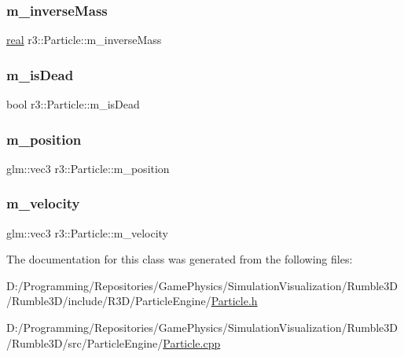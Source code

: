 \subsubsection{\texorpdfstring{m\+\_\+inverse\+Mass}{m\_inverseMass}}
{\footnotesize\ttfamily \mbox{\hyperlink{namespacer3_ab2016b3e3f743fb735afce242f0dc1eb}{real}} r3\+::\+Particle\+::m\+\_\+inverse\+Mass\hspace{0.3cm}{\ttfamily [protected]}}

\mbox{\label{classr3_1_1_particle_a0a04ce870abc9017f09c2564344fda82}} 
\subsubsection{\texorpdfstring{m\+\_\+is\+Dead}{m\_isDead}}
{\footnotesize\ttfamily bool r3\+::\+Particle\+::m\+\_\+is\+Dead\hspace{0.3cm}{\ttfamily [protected]}}

\mbox{\label{classr3_1_1_particle_ab7f5aa7cf48278441aab18db1a0c1ba9}} 
\subsubsection{\texorpdfstring{m\+\_\+position}{m\_position}}
{\footnotesize\ttfamily glm\+::vec3 r3\+::\+Particle\+::m\+\_\+position\hspace{0.3cm}{\ttfamily [protected]}}

\mbox{\label{classr3_1_1_particle_a037d73e42df0c7bb9f1ae79b37301477}} 
\subsubsection{\texorpdfstring{m\+\_\+velocity}{m\_velocity}}
{\footnotesize\ttfamily glm\+::vec3 r3\+::\+Particle\+::m\+\_\+velocity\hspace{0.3cm}{\ttfamily [protected]}}



The documentation for this class was generated from the following files\+:\begin{DoxyCompactItemize}
\item 
D\+:/\+Programming/\+Repositories/\+Game\+Physics/\+Simulation\+Visualization/\+Rumble3\+D/\+Rumble3\+D/include/\+R3\+D/\+Particle\+Engine/\mbox{\hyperlink{_particle_8h}{Particle.\+h}}\item 
D\+:/\+Programming/\+Repositories/\+Game\+Physics/\+Simulation\+Visualization/\+Rumble3\+D/\+Rumble3\+D/src/\+Particle\+Engine/\mbox{\hyperlink{_particle_8cpp}{Particle.\+cpp}}\end{DoxyCompactItemize}
